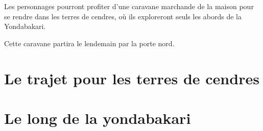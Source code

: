 \documentclass[letterpaper,10pt,twoside,twocolumn,openany]{book}
\begin{document}
Les personnages pourront profiter d'une caravane marchande de la maison pour se rendre dans les terres de cendres, où ils exploreront seuls les abords de la Yondabakari.

Cette caravane partira le lendemain par la porte nord.
\section{Le trajet pour les terres de cendres}
\section{Le long de la yondabakari}
\end{document}
